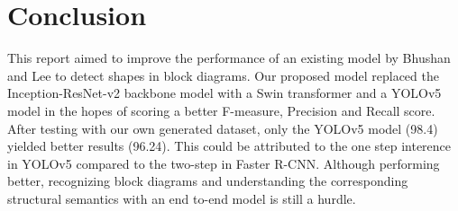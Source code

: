 \section{Conclusion}

This report aimed to improve the performance of an existing model by Bhushan and Lee to detect shapes in block diagrams. Our proposed model replaced the Inception-ResNet-v2 backbone model with a Swin transformer and a YOLOv5 model in the hopes of scoring a better F-measure, Precision and Recall score.  After testing with our own generated dataset, only the YOLOv5 model (98.4) yielded better results (96.24). This could be attributed to the one step interence in YOLOv5 compared to the two-step in Faster R-CNN. Although performing better, recognizing block diagrams and understanding the corresponding structural semantics with an end to-end model is still a hurdle.